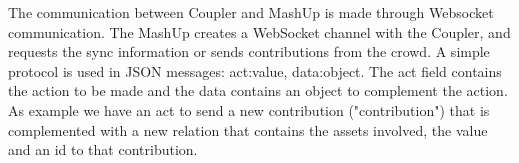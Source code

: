 The communication  between Coupler and MashUp is made through Websocket communication. The MashUp creates a WebSocket channel with the Coupler, and requests the sync information or sends contributions from the crowd. A simple protocol is used in JSON messages: {act:value, data:object}. The act field contains the action to be made and the data contains an object to complement the action. As example we have an act to send a new contribution ("contribution") that is complemented with a new relation that contains the assets involved, the value and an id to that contribution.






